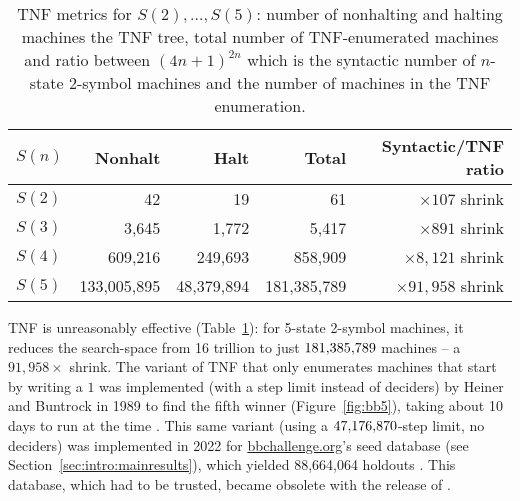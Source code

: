 \begin{table}[h!]
    \centering
    \begin{tabular}{|l|r|r|r|r|}
        \hline
        $S(n)$ & Nonhalt     & Halt       & Total       & Syntactic/TNF ratio    \\
        \hline
        $S(2)$ & 42          & 19         & 61          & $\times 107$ shrink    \\
        $S(3)$ & 3,645       & 1,772      & 5,417       & $\times 891$ shrink    \\
        $S(4)$ & 609,216     & 249,693    & 858,909     & $\times 8,121$ shrink  \\
        $S(5)$ & 133,005,895 & 48,379,894 & 181,385,789 & $\times 91,958$ shrink \\
        \hline
    \end{tabular}

    \caption{TNF metrics for $S(2),\dots,S(5)$: number of nonhalting and halting machines the TNF tree, total number of TNF-enumerated machines and ratio between $(4n+1)^{2n}$ which is the syntactic number of $n$-state 2-symbol machines and the number of machines in the TNF enumeration.}\label{tab:TNF-numbers}
\end{table}

TNF is unreasonably effective (Table~\ref{tab:TNF-numbers}): for 5-state 2-symbol machines, it reduces the search-space from 16 trillion to just $181{,}385{,}789$ machines -- a $91{,}958\times$ shrink. The variant of TNF that only enumerates machines that start by writing a $1$ was implemented (with a step limit instead of deciders) by Heiner and Buntrock in 1989 to find the fifth \BBfull winner (Figure~\ref{fig:bb5}), taking about 10 days to run at the time \cite{Marxen_1990}. This same variant (using a $47{,}176{,}870$-step limit, no deciders) was implemented in 2022 for \url{bbchallenge.org}’s seed database (see Section~\ref{sec:intro:mainresults}), which yielded 88,664,064 holdouts  \cite{sterin_2022_14955828}. This database, which had to be trusted, became obsolete with the release of \CoqBB. %

